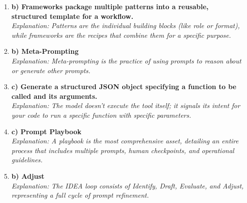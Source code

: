 \documentclass{article}
\begin{document}
\begin{enumerate}
    \item \textbf{b) Frameworks package multiple patterns into a reusable, structured template for a workflow.} \\
    \textit{Explanation: Patterns are the individual building blocks (like role or format), while frameworks are the recipes that combine them for a specific purpose.}

    \item \textbf{b) Meta-Prompting} \\
    \textit{Explanation: Meta-prompting is the practice of using prompts to reason about or generate other prompts.}

    \item \textbf{c) Generate a structured JSON object specifying a function to be called and its arguments.} \\
    \textit{Explanation: The model doesn't execute the tool itself; it signals its intent for your code to run a specific function with specific parameters.}

    \item \textbf{c) Prompt Playbook} \\
    \textit{Explanation: A playbook is the most comprehensive asset, detailing an entire process that includes multiple prompts, human checkpoints, and operational guidelines.}

    \item \textbf{b) Adjust} \\
    \textit{Explanation: The IDEA loop consists of Identify, Draft, Evaluate, and Adjust, representing a full cycle of prompt refinement.}

\end{enumerate}
\end{document}
